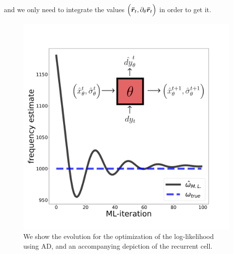and we only need to integrate the values $\Big(\bm{\bar{r}}_t, \partial_\theta \bm{\bar{r}}_t\Big)$ in order to get it.

\begin{figure}[t!]
    \centering
    \includegraphics[width=.75\textwidth]{Figures/CMON/estimation/ml_fit_with_GRNN.pdf}
    \caption{We show the evolution for the optimization of the log-likelihood using AD, and an accompanying depiction of the recurrent cell.}
    \label{fig:rncell}
\end{figure}

